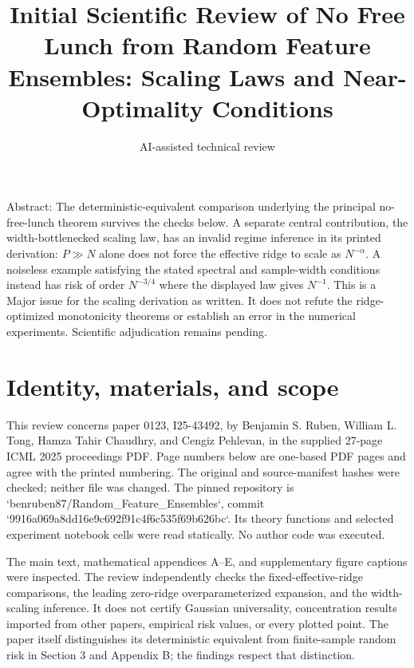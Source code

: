 \documentclass[10pt]{article}
\title{Initial Scientific Review of
No Free Lunch from Random Feature Ensembles:
Scaling Laws and Near-Optimality Conditions}
\author{AI-assisted technical review}
\date{}
\begin{document}
\maketitle
Abstract: The deterministic-equivalent comparison underlying the principal no-free-lunch theorem survives the checks below. A separate central contribution, the width-bottlenecked scaling law, has an invalid regime inference in its printed derivation: \(P\gg N\) alone does not force the effective ridge to scale as \(N^{-\alpha}\). A noiseless example satisfying the stated spectral and sample-width conditions instead has risk of order \(N^{-3/4}\) where the displayed law gives \(N^{-1}\). This is a Major issue for the scaling derivation as written. It does not refute the ridge-optimized monotonicity theorems or establish an error in the numerical experiments. Scientific adjudication remains pending.\par
\section*{Identity, materials, and scope}
This review concerns paper 0123, I25-43492, by Benjamin S. Ruben, William L. Tong, Hamza Tahir Chaudhry, and Cengiz Pehlevan, in the supplied 27-page ICML 2025 proceedings PDF. Page numbers below are one-based PDF pages and agree with the printed numbering. The original and source-manifest hashes were checked; neither file was changed. The pinned repository is `benruben87/Random\_Feature\_Ensembles`, commit `9916a069a8dd16e9c692f91c4f6c535f69b626bc`. Its theory functions and selected experiment notebook cells were read statically. No author code was executed.\par
The main text, mathematical appendices A–E, and supplementary figure captions were inspected. The review independently checks the fixed-effective-ridge comparisons, the leading zero-ridge overparameterized expansion, and the width-scaling inference. It does not certify Gaussian universality, concentration results imported from other papers, empirical risk values, or every plotted point. The paper itself distinguishes its deterministic equivalent from finite-sample random risk in Section 3 and Appendix B; the findings respect that distinction.\par
\end{document}
